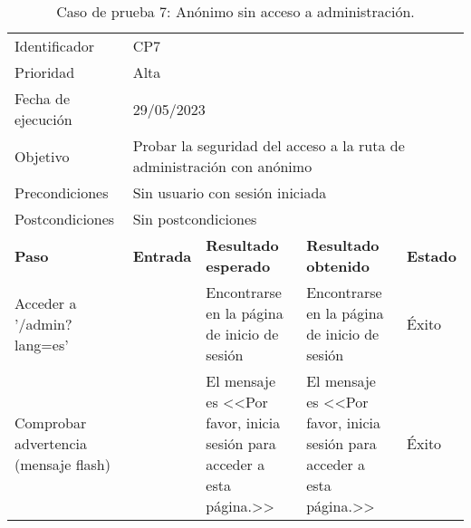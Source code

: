 \begin{table}[H]
\begin{tabular}{p{}p{}p{}p{}p{}}
\rowcolor{gray!25}
Identificador   & \multicolumn{4}{l}{CP7}                                                   \\
Prioridad   & \multicolumn{4}{l}{Alta}                                                    \\
\rowcolor{gray!25}
Fecha de ejecución   & \multicolumn{4}{l}{29/05/2023}                                                    \\
Objetivo        & \multicolumn{4}{p{0.80\textwidth}}{Probar la seguridad del acceso a la ruta de administración con anónimo}                                                     \\
\rowcolor{gray!25}
Precondiciones  & \multicolumn{4}{l}{Sin usuario con sesión iniciada}                                                     \\
Postcondiciones & \multicolumn{4}{l}{Sin postcondiciones}                                                     \\ \hline
\rowcolor{gray!25}
\textbf{Paso}   & \textbf{Entrada} & \textbf{Resultado esperado} & \textbf{Resultado obtenido} & \textbf{Estado} \\ \hline
Acceder a '/admin?lang=es'                         &                        & Encontrarse en la página de inicio de sesión                                 & Encontrarse en la página de inicio de sesión                                     & Éxito  \\ \hline
Comprobar advertencia (mensaje flash)      &                        & El mensaje es <<Por favor, inicia sesión para acceder a esta página.>>                               & El mensaje es <<Por favor, inicia sesión para acceder a esta página.>>                                 & Éxito  \\ \hline 
\end{tabular}
\caption{Caso de prueba 7: Anónimo sin acceso a administración.}
\end{table}


